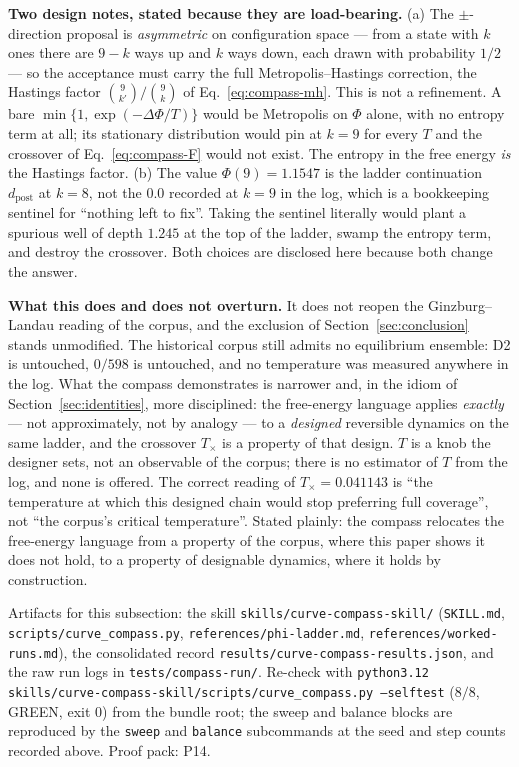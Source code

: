 \documentclass[11pt,a4paper]{article}
\theoremstyle{plain}
\theoremstyle{remark}
\theoremstyle{plain}
\begin{document}
\textbf{Two design notes, stated because they are load-bearing.} (a) The
$\pm$-direction proposal is \emph{asymmetric} on configuration space --- from a
state with $k$ ones there are $9-k$ ways up and $k$ ways down, each drawn with
probability $1/2$ --- so the acceptance must carry the full Metropolis--Hastings
correction, the Hastings factor $\binom{9}{k'}/\binom{9}{k}$ of
Eq.~\eqref{eq:compass-mh}. This is not a refinement. A bare
$\min\{1,\exp(-\Delta\Phi/T)\}$ would be Metropolis on $\Phi$ alone, with no
entropy term at all; its stationary distribution would pin at $k=9$ for every $T$
and the crossover of Eq.~\eqref{eq:compass-F} would not exist. The entropy in the
free energy \emph{is} the Hastings factor. (b) The value $\Phi(9)=1.1547$ is the
ladder continuation $d_{\mathrm{post}}$ at $k=8$, not the $0.0$ recorded at $k=9$
in the log, which is a bookkeeping sentinel for ``nothing left to fix''. Taking
the sentinel literally would plant a spurious well of depth $1.245$ at the top of
the ladder, swamp the entropy term, and destroy the crossover. Both choices are
disclosed here because both change the answer.

\textbf{What this does and does not overturn.} It does not reopen the
Ginzburg--Landau reading of the corpus, and the exclusion of
Section~\ref{sec:conclusion} stands unmodified. The historical corpus still admits
no equilibrium ensemble: D2 is untouched, $0/598$ is untouched, and no temperature
was measured anywhere in the log. What the compass demonstrates is narrower and,
in the idiom of Section~\ref{sec:identities}, more disciplined: the free-energy
language applies \emph{exactly} --- not approximately, not by analogy --- to a
\emph{designed} reversible dynamics on the same ladder, and the crossover
$T_\times$ is a property of that design. $T$ is a knob the designer sets, not an
observable of the corpus; there is no estimator of $T$ from the log, and none is
offered. The correct reading of $T_\times=0.041143$ is ``the temperature at which
this designed chain would stop preferring full coverage'', not ``the corpus's
critical temperature''. Stated plainly: the compass relocates the free-energy
language from a property of the corpus, where this paper shows it does not hold,
to a property of designable dynamics, where it holds by construction.

Artifacts for this subsection: the skill
\texttt{skills/curve-compass-skill/} (\texttt{SKILL.md},
\texttt{scripts/curve\_compass.py}, \texttt{references/phi-ladder.md},
\texttt{references/worked-runs.md}), the consolidated record
\texttt{results/curve-compass-results.json}, and the raw run logs in
\texttt{tests/compass-run/}. Re-check with
\texttt{python3.12 skills/curve-compass-skill/scripts/curve\_compass.py --selftest}
($8/8$, GREEN, exit $0$) from the bundle root; the sweep and balance blocks are
reproduced by the \texttt{sweep} and \texttt{balance} subcommands at the seed and
step counts recorded above. Proof pack: P14.
\end{document}
